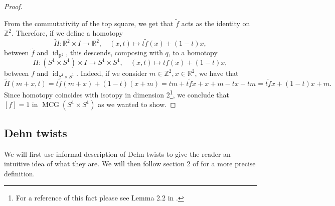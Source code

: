\documentclass[a4paper,12 pt,titlepage,twoside]{book}
\newcommand{\numberset}{\mathbb}
\newcommand{\Z}{\numberset{Z}}
\newcommand{\R}{\numberset{R}}
\DeclareMathOperator{\mcg}{MCG}
\DeclareMathOperator{\id}{id}
\theoremstyle{plain}
\theoremstyle{theorem}
\theoremstyle{definition}
\theoremstyle{remark}
\begin{document}
\begin{proof}
\begin{center}
	\end{center}
	From the commutativity of the top square, we get that $\tilde{f}$ acts as the identity on $\Z^2$. Therefore, if we define a homotopy $$\tilde{H} \colon \R^2 \times I \rightarrow \R^2, \quad (x,t) \mapsto t \tilde{f}(x) + (1-t)x,$$ between $\tilde{f}$ and $\id_{\R^2}$, this descends, composing with $q$, to a homotopy $$H \colon (S^1 \times S^1) \times I \rightarrow S^1 \times S^1, \quad (x,t) \mapsto tf(x) +(1-t)x,$$ between $f$ and $\id_{S^1 \times S^1}.$ Indeed, if we consider $m \in \Z^2, x \in \R^2$, we have that $$\tilde{H}(m+x,t) = t\tilde{f}(m+x) + (1-t)(x+m) = tm + t\tilde{f}x + x+m -tx -tm = t\tilde{f}x + (1-t)x +m.$$ Since homotopy coincides with isotopy in dimension 2\footnote{For a reference of this fact please see Lemma 2.2 in \cite{wilton_2019}.}, we conclude that $[f]=1$ in $\mcg(S^1 \times S^1)$ as we wanted to show.	
\end{proof}

	
\subsection{Dehn twists}\label{sec: dehn twist}
	We will first use \cite{MR2807457} informal description of Dehn twists to give the reader an intuitive idea of what they are. We will then follow section 2 of \cite{massuyea2009short} for a more precise definition.
	
\end{document}

